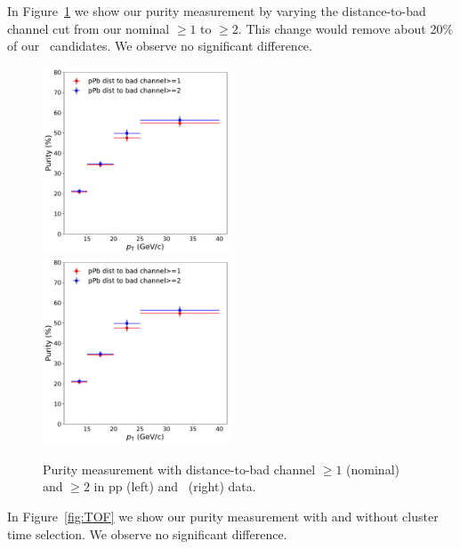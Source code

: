In Figure~\ref{fig:distancetobadchannel} we show our purity measurement by varying the distance-to-bad channel cut from our nominal $\geq 1$ to $\geq 2$. This change would remove about 20$\%$ of our \gammaiso~candidates. We observe no significant difference. 

\begin{figure}
	\center
	\includegraphics[width=0.495\textwidth]{Appendices/ppbdistance.pdf}
	\includegraphics[width=0.495\textwidth]{Appendices/ppbdistance.pdf}
	\caption{Purity measurement with distance-to-bad channel $\geq 1$ (nominal) and $\geq 2$ in pp (left) and \pPb~(right) data.}
	\label{fig:distancetobadchannel}
\end{figure}

In Figure~\ref{fig:TOF} we show our purity measurement with and without cluster time selection. We observe no significant difference. 


